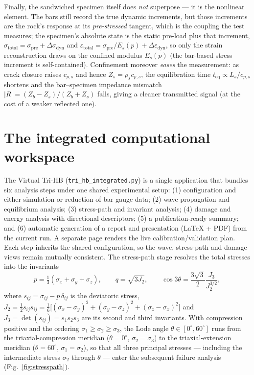 \documentclass[sn-basic]{sn-jnl}
\begin{document}
Finally, the sandwiched specimen itself does \emph{not} superpose --- it is the
nonlinear element. The bars still record the true dynamic increments, but those
increments are the rock's response at its \emph{pre-stressed} tangent, which is the
coupling the test measures; the specimen's absolute state is the static pre-load
plus that increment,
$\sigma_{\mathrm{total}}=\sigma_{\mathrm{pre}}+\Delta\sigma_{\mathrm{dyn}}$ and
$\varepsilon_{\mathrm{total}}=\sigma_{\mathrm{pre}}/E_s(p)+\Delta\varepsilon_{\mathrm{dyn}}$,
so only the strain reconstruction draws on the confined modulus $E_s(p)$ (the
bar-based stress increment is self-contained). Confinement moreover \emph{eases}
the measurement: as crack closure raises $c_{p,s}$ and hence $Z_s=\rho_s c_{p,s}$,
the equilibration time $t_{\mathrm{eq}}\propto L_s/c_{p,s}$ shortens and the
bar--specimen impedance mismatch $|R|=(Z_b-Z_s)/(Z_b+Z_s)$ falls, giving a cleaner
transmitted signal (at the cost of a weaker reflected one).

\section{The integrated computational workspace}\label{sec:twin}

The Virtual Tri-HB (\texttt{tri\_hb\_integrated.py}) is a single application that
bundles six analysis steps under one shared experimental setup: (1) configuration
and either simulation or reduction of bar-gauge data; (2) wave-propagation and
equilibrium analysis; (3) stress-path and invariant analysis; (4) damage and
energy analysis with directional descriptors; (5) a publication-ready summary;
and (6) automatic generation of a report and presentation (\LaTeX{} + PDF) from
the current run. A separate page renders the live calibration/validation plan.
Each step inherits the shared configuration, so the wave, stress-path and damage
views remain mutually consistent. The stress-path stage resolves the total
stresses into the invariants
\begin{equation}
p=\tfrac{1}{3}(\sigma_x+\sigma_y+\sigma_z),\qquad
q=\sqrt{3J_2},\qquad
\cos 3\theta=\frac{3\sqrt3}{2}\frac{J_3}{J_2^{3/2}},
\label{eq:invariants}
\end{equation}
where $s_{ij}=\sigma_{ij}-p\,\delta_{ij}$ is the deviatoric stress,
$J_2=\tfrac12 s_{ij}s_{ij}=\tfrac16\big[(\sigma_x-\sigma_y)^2+(\sigma_y-\sigma_z)^2+(\sigma_z-\sigma_x)^2\big]$
and $J_3=\det(s_{ij})=s_1s_2s_3$ are its second and third invariants. With compression positive and the ordering
$\sigma_1\ge\sigma_2\ge\sigma_3$, the Lode angle $\theta\in[0^\circ,60^\circ]$
runs from the triaxial-compression meridian ($\theta=0^\circ$, $\sigma_2=\sigma_3$)
to the triaxial-extension meridian ($\theta=60^\circ$, $\sigma_1=\sigma_2$), so
that all three principal stresses --- including the intermediate stress
$\sigma_2$ through $\theta$ --- enter the subsequent failure analysis
(Fig.~\ref{fig:stresspath}).
\end{document}

